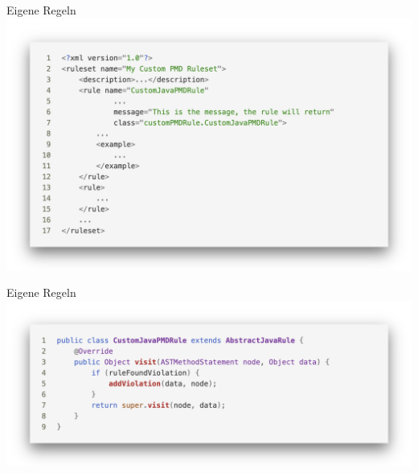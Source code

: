 \documentclass{sdqbeamer}
\begin{document}
\begin{frame}[fragile]{Eigene Regeln}
\vspace{-0.5cm}
\hspace{-0.7cm}
\includegraphics[scale=0.24]{logos/CustomRulesetXML.png}
\end{frame}

\begin{frame}[fragile]{Eigene Regeln}
    \vspace{-0.5cm}
    \hspace{-0.7cm}
    \includegraphics[scale=0.25]{logos/CustomRuleJava.png}
\end{frame}
\end{document}
